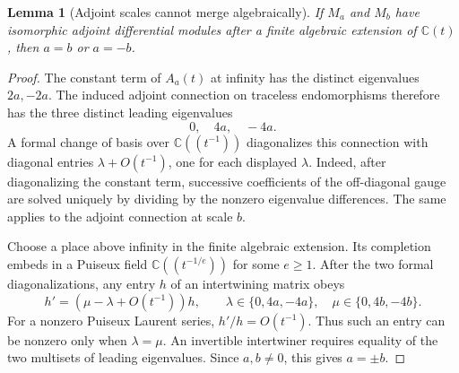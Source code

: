\documentclass[11pt,a4paper]{article}
\newtheorem{lemma}[theorem]{Lemma}
\theoremstyle{definition}
\theoremstyle{remark}
\numberwithin{equation}{section}
\begin{document}
\begin{lemma}[Adjoint scales cannot merge algebraically]
\label{mpj:adjoint}
If $M_a$ and $M_b$ have isomorphic adjoint differential modules
after a finite algebraic extension of $\mathbb C(t)$, then
$a=b$ or $a=-b$.
\end{lemma}
\begin{proof}
The constant term of $A_a(t)$ at infinity has the distinct
eigenvalues $2a,-2a$. The induced adjoint connection on traceless
endomorphisms therefore has the three distinct leading eigenvalues
\[
                         0,\quad 4a,\quad -4a.
\]
A formal change of basis over $\mathbb C((t^{-1}))$ diagonalizes
this connection with diagonal entries
$\lambda+O(t^{-1})$, one for each displayed $\lambda$.
Indeed, after diagonalizing the constant term, successive
coefficients of the off-diagonal gauge are solved uniquely by
dividing by the nonzero eigenvalue differences. The same applies
to the adjoint connection at scale $b$.

Choose a place above infinity in the finite algebraic extension.
Its completion embeds in a Puiseux field
$\mathbb C((t^{-1/e}))$ for some $e\ge1$. After the two formal
diagonalizations, any entry $h$ of an intertwining matrix obeys
\[
 h'=(\mu-\lambda+O(t^{-1}))h,
 \qquad \lambda\in\{0,4a,-4a\},\quad
        \mu\in\{0,4b,-4b\}.
\]
For a nonzero Puiseux Laurent series, $h'/h=O(t^{-1})$.
Thus such an entry can be nonzero only when $\lambda=\mu$.
An invertible intertwiner requires equality of the two multisets
of leading eigenvalues. Since $a,b\ne0$, this gives $a=\pm b$.
\end{proof}
\end{document}

